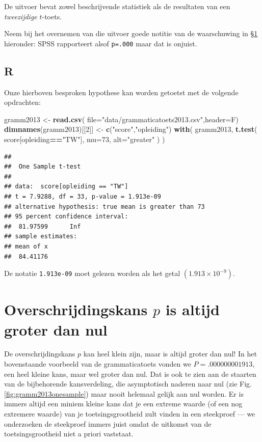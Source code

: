 \documentclass[
]{book}
\newenvironment{Shaded}{\begin{snugshade}}{\end{snugshade}}
\newcommand{\DataTypeTok}[1]{\textcolor[rgb]{0.13,0.29,0.53}{#1}}
\newcommand{\DecValTok}[1]{\textcolor[rgb]{0.00,0.00,0.81}{#1}}
\newcommand{\KeywordTok}[1]{\textcolor[rgb]{0.13,0.29,0.53}{\textbf{#1}}}
\newcommand{\NormalTok}[1]{#1}
\newcommand{\OperatorTok}[1]{\textcolor[rgb]{0.81,0.36,0.00}{\textbf{#1}}}
\newcommand{\StringTok}[1]{\textcolor[rgb]{0.31,0.60,0.02}{#1}}
\begin{document}
De uitvoer bevat zowel beschrijvende statistiek als de resultaten van
een \emph{tweezijdige} \(t\)-toets.

Neem bij het overnemen van die uitvoer goede notitie van de waarschuwing in
§\ref{sec:pgroterdannul} hieronder: SPSS rapporteert alsof \texttt{p=.000} maar dat is onjuist.

\hypertarget{r-11}{%
\subsection{R}\label{r-11}}

Onze hierboven besproken hypothese kan worden getoetst met de volgende opdrachten:

\begin{Shaded}
\begin{Highlighting}[]
\NormalTok{gramm2013 \textless{}{-}}\StringTok{ }\KeywordTok{read.csv}\NormalTok{( }\DataTypeTok{file=}\StringTok{"data/grammaticatoets2013.csv"}\NormalTok{,}\DataTypeTok{header=}\NormalTok{F)}
\KeywordTok{dimnames}\NormalTok{(gramm2013)[[}\DecValTok{2}\NormalTok{]] \textless{}{-}}\StringTok{ }\KeywordTok{c}\NormalTok{(}\StringTok{"score"}\NormalTok{,}\StringTok{"opleiding"}\NormalTok{)}
\KeywordTok{with}\NormalTok{( gramm2013,}
      \KeywordTok{t.test}\NormalTok{( score[opleiding}\OperatorTok{==}\StringTok{"TW"}\NormalTok{], }\DataTypeTok{mu=}\DecValTok{73}\NormalTok{, }\DataTypeTok{alt=}\StringTok{"greater"}\NormalTok{ ) )}
\end{Highlighting}
\end{Shaded}

\begin{verbatim}
## 
##  One Sample t-test
## 
## data:  score[opleiding == "TW"]
## t = 7.9288, df = 33, p-value = 1.913e-09
## alternative hypothesis: true mean is greater than 73
## 95 percent confidence interval:
##  81.97599      Inf
## sample estimates:
## mean of x 
##  84.41176
\end{verbatim}

De notatie \texttt{1.913e-09} moet gelezen worden als het getal
\((1.913 \times 10^{-9})\).

\hypertarget{sec:pgroterdannul}{%
\section{\texorpdfstring{Overschrijdingskans \(p\) is altijd groter dan nul}{Overschrijdingskans p is altijd groter dan nul}}\label{sec:pgroterdannul}}

De overschrijdingskans \(p\) kan heel klein zijn, maar is altijd groter
dan nul! In het bovenstaande voorbeeld van de grammaticatoets
vonden we \(P=.000000001913\), een heel kleine kans, maar wel groter dan
nul. Dat is ook te zien aan de staarten van de bijbehorende
kansverdeling, die asymptotisch naderen naar nul (zie
Fig.\ref{fig:gramm2013onesample}) maar nooit helemaal gelijk aan nul
worden. Er is immers altijd een miniem kleine kans dat je een extreme
waarde (of een nog extremere waarde) van je toetsingsgrootheid zult
vinden in een steekproef --- we onderzoeken de steekproef immers juist
omdat de uitkomst van de toetsingsgrootheid niet a priori vaststaat.
\end{document}

